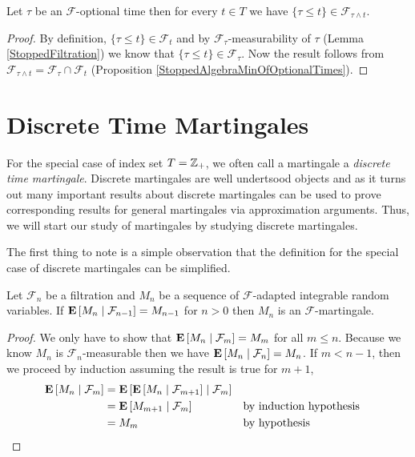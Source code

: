 \begin{cor}\label{MeasurabilityOfOptionalHalfIntervals}Let $\tau$ be an $\mathcal{F}$-optional time then for every $t \in T$ we have $\lbrace \tau \leq t \rbrace \in \mathcal{F}_{\tau \wedge t}$.
\end{cor}
\begin{proof}
By definition, $\lbrace \tau \leq t \rbrace \in \mathcal{F}_t$ and by $\mathcal{F}_\tau$-measurability of $\tau$ (Lemma \ref{StoppedFiltration}) we know that $\lbrace \tau \leq t \rbrace \in \mathcal{F}_\tau$.  Now the result follows from $\mathcal{F}_{\tau \wedge t} = \mathcal{F}_\tau \cap \mathcal{F}_t$ (Proposition \ref{StoppedAlgebraMinOfOptionalTimes}).
\end{proof}

\section{Discrete Time Martingales}
For the special case of index set $T = \integers_+$, we often call a
martingale a \emph{discrete time martingale}.  Discrete martingales are well
undertsood objects and as it turns out many important results about discrete
martingales can be used to prove corresponding results for general martingales via approximation
arguments.  Thus, we will start our study of martingales by studying
discrete martingales.

The first thing to note is a simple observation that the definition
for the special case of discrete martingales can be simplified.
\begin{lem}Let $\mathcal{F}_n$ be a filtration and $M_n$ be a sequence
  of $\mathcal{F}$-adapted integrable random variables.  If
  $\cexpectationlong{\mathcal{F}_{n-1}}{M_n} = M_{n-1}$ for $n > 0$ then $M_n$
  is an $\mathcal{F}$-martingale.
\end{lem}
\begin{proof}We only have to show that
  $\cexpectationlong{\mathcal{F}_m}{M_n} = M_m$ for all $m \leq n$.
  Because we know $M_n$ is $\mathcal{F}_n$-measurable then we have
  $\cexpectationlong{\mathcal{F}_n}{M_n} = M_n$.  If $m < n-1$, then we
  proceed by induction
  assuming the result is true for $m+1$,
\begin{align*}
\cexpectationlong{\mathcal{F}_m}{M_n} &=
\cexpectationlong{\mathcal{F}_m}{\cexpectationlong{\mathcal{F}_{m+1}}{M_n}} \\
&=\cexpectationlong{\mathcal{F}_m}{M_{m+1}} & & \text{by induction hypothesis}\\
&= M_m & & \text{by hypothesis}
\end{align*}
\end{proof}

